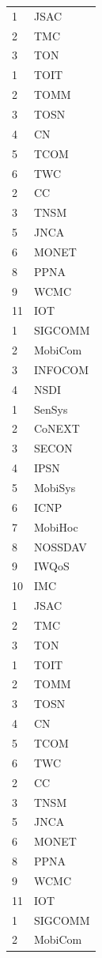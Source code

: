 \documentclass[doctor, vlined, ]{DissertUESTC}
\begin{document}
\begin{longtable}{p{2em} p{4.5em}}
		1 & JSAC \\
		2 & TMC \\
		3 & TON \\
		1 & TOIT \\
		2 & TOMM \\
		3 & TOSN \\
		4 & CN \\
		5 & TCOM \\
		6 & TWC \\
		2 & CC \\
		3 & TNSM \\
		5 & JNCA \\
		6 & MONET \\
		8 & PPNA \\
		9 & WCMC \\
		11 & IOT \\
		1 & SIGCOMM \\
		2 & MobiCom \\
		3 & INFOCOM \\
		4 & NSDI \\
		1 & SenSys \\
		2 & CoNEXT \\
		3 & SECON \\
		4 & IPSN \\
		5 & MobiSys \\
		6 & ICNP \\
		7 & MobiHoc \\
		8 & NOSSDAV \\
		9 & IWQoS \\
		10 & IMC \\
		1 & JSAC \\
		2 & TMC \\
		3 & TON \\
		1 & TOIT \\
		2 & TOMM \\
		3 & TOSN \\
		4 & CN \\
		5 & TCOM \\
		6 & TWC \\
		2 & CC \\
		3 & TNSM \\
		5 & JNCA \\
		6 & MONET \\
		8 & PPNA \\
		9 & WCMC \\
		11 & IOT \\
		1 & SIGCOMM \\
		2 & MobiCom \\

\end{longtable}
\end{document}
